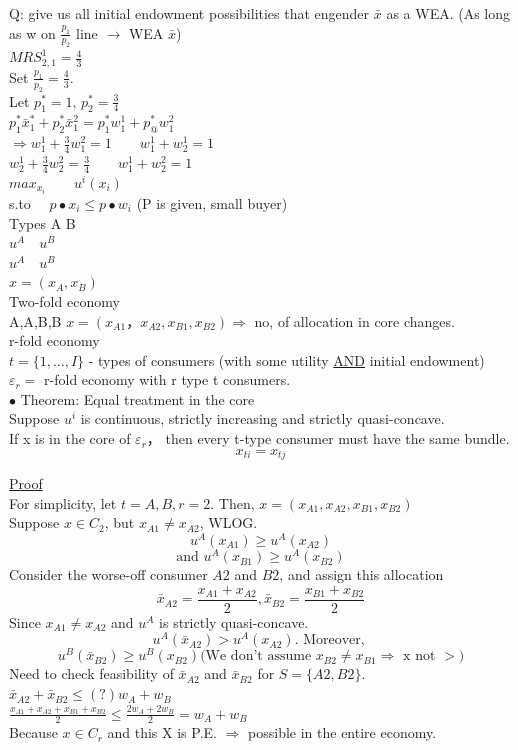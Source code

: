 \documentclass[letterpaper,13pt,single,pdftex]{scrartcl}
\begin{document}
Q: give us all initial endowment possibilities that engender $\bar{x}$ as a WEA. (As long as w on $\frac{p_1}{p_2}$ line $\rightarrow$ WEA $\bar{x}$)\\
$MRS_{2,1}^1 = \frac{4}{3}$\\
Set $\frac{p_1}{p_2} = \frac{4}{3}.$ \\
Let $p_1^* = 1, \, p_2^* = \frac{3}{4}$\\
$p_1^* \bar{x}_1^* + p_2^*\bar{x}_1^2 = p_1^*w_1^1 +p_@^*w_1^2$\\
$\Rightarrow w_1^1 + \frac{3}{4}w_1^2 = 1 \qquad w_1^1 + w_2^1 = 1$\\
$w_2^1 +\frac{3}{4}w_2^2 =\frac{3}{4}\qquad w_1^1 +w_2^2 =1 $\\

$max_{x_i} \qquad u^i(x_i)$\\
s.to $\quad p\bullet x_i \le p \bullet w_i$ (P is given, small buyer)\\
Types A   B\\
      $u^A \quad u^B$\\
      $u^A \quad u^B$\\
      $x= (x_A,x_B)$\\
Two-fold economy\\
    A,A,B,B
    $x = (x_{A1}，x_{A2}, x_{B1}, x_{B2}) \Rightarrow$ no, of allocation in core changes.\\

r-fold economy\\
$t = \{ 1,\dots, I\}$ - types of consumers (with some utility \underline{AND} initial endowment)\\
$\varepsilon_r = $ r-fold economy with r type t consumers. \\

$\bullet$ Theorem: Equal treatment in the core\\
Suppose $u^i$ is continuous, strictly increasing and strictly quasi-concave. \\
If x is in the core of $\varepsilon_r$， then every t-type consumer must have the same bundle.
\[x_{ti} = x_{tj}\]

\underline{Proof}\\
For simplicity, let $t = A, B, r=2$. Then, $x= (x_{A1},x_{A2},x_{B1}, x_{B2})$\\
Suppose $x\in C_2$, but $x_{A1} \ne x_{A2}$, WLOG. 
\[u^A(x_{A1} )\ge u^A(x_{A2})\]
\[\text{and }u^A(x_{B1} )\ge u^A(x_{B2})\]
Consider the worse-off consumer $A2$ and $B2$, and assign this allocation
\[\bar{x}_{A2} = \frac{x_{A1}+x_{A2}}{2}, \bar{x}_{B2} = \frac{x_{B1}+x_{B2}}{2}\]
Since $x_{A1} \ne x_{A2}$ and $u^A$ is strictly quasi-concave. 
\[u^A(\bar{x}_{A2})> u^A(x_{A2}) \text{. Moreover, }\]
\[u^B(\bar{x}_{B2})\ge u^B(x_{B2}) \text{(We don't assume $x_{B2} \ne x_{B1}\Rightarrow$ x not $>$)} \]
Need to check feasibility of $\bar{x}_{A2} $ and $\bar{x}_{B2}$ for $S = \{A2, B2\}.$\\
$\bar{x}_{A2} + \bar{x}_{B2} \le (?) w_A + w_B$\\
$\frac{x_{A1}+x_{A2}+x_{B1}+x_{B2}}{2}\le \frac{2w_A + 2w_B}{2} = w_A + w_B$\\
Because $x\in C_r$ and this X is P.E. $\Rightarrow$ possible in the entire economy. \\
\end{document}
